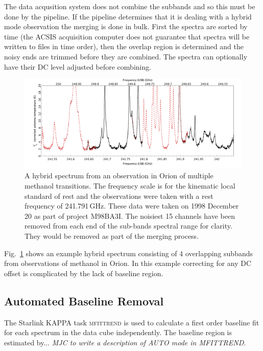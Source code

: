 \documentclass[final,authoryear,5p,times,twocolumn]{elsarticle}
\begin{document}
The data acqusition system does not combine the subbands and so this
must be done by the pipeline. If the pipeline determines that it is
dealing with a hybrid mode observation the merging is done in
bulk. First the spectra are sorted by time (the ACSIS acquisition
computer does not guarantee that spectra will be written to files in
time order), then the overlap region is determined and the noisy ends
are trimmed before they are combined. The spectra can optionally have
their DC level adjusted before combining.

\begin{figure}
\begin{minipage}{\textwidth}
\includegraphics[width=\textwidth]{hybrid}
\caption{A hybrid spectrum from an observation in Orion of multiple
  methanol transitions. The frequency scale is for the kinematic local
  standard of rest and the observations were taken with a rest
  frequency of 241.791\,GHz. These data were taken on 1998 December 20
  as part of project M98BA3I. The noisiest 15 channels have been
  removed from each end of the sub-bands spectral range for
  clarity. They would be removed as part of the merging process.}
\label{fig:hybrid}
\end{minipage}
\end{figure}

Fig.\ \ref{fig:hybrid} shows an example hybrid spectrum consisting of
4 overlapping subbands from observations of methanol in Orion. In this
example correcting for any DC offset is complicated by the lack of
baseline region.

\subsection{Automated Baseline Removal}

The Starlink KAPPA task \textsc{mfittrend} is used to calculate a
first order baseline fit for each spectrum in the data cube
independently. The baseline region is estimated by...
\emph{\color{red} MJC to
  write a description of AUTO mode in MFITTREND}.
\end{document}
